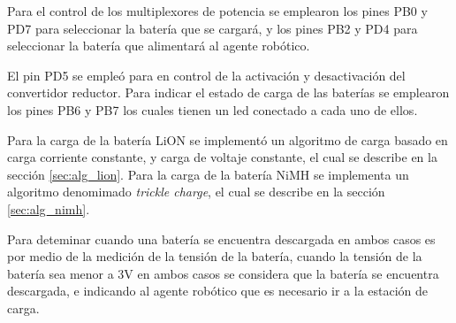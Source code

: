     Para el control de los multiplexores de potencia se emplearon los pines
    PB0 y PD7 para seleccionar la batería que se cargará, y los pines PB2 y 
    PD4 para seleccionar la batería que alimentará al agente robótico.

    El pin PD5 se empleó para en control de la activación y desactivación
    del convertidor reductor. Para indicar el estado de carga de las baterías
    se emplearon los pines PB6 y PB7 los cuales tienen un led conectado a cada
    uno de ellos.

    Para la carga de la batería LiON se implementó un algoritmo de carga
    basado en carga corriente constante, y carga de voltaje constante, el cual
    se describe en la sección \ref{sec:alg_lion}. Para la carga de la batería
    NiMH se implementa un algoritmo denomimado \textit{trickle charge}, el cual 
    se describe en la sección \ref{sec:alg_nimh}.

    Para deteminar cuando una batería se encuentra descargada en ambos casos
    es por medio de la medición de la tensión de la batería, cuando la tensión
    de la batería sea menor a $3\text{V}$ en ambos casos se considera que la
    batería se encuentra descargada, e indicando al agente robótico que es necesario
    ir a la estación de carga.




